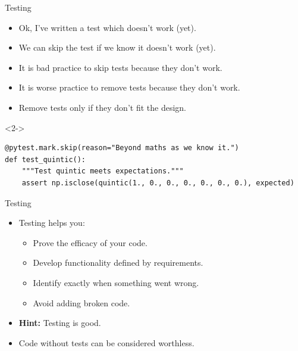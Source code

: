 \documentclass[usenames,dvipsnames]{beamer}
\begin{document}
\begin{frame}[fragile]{Testing}
    \begin{itemize}[<+->]
        \item{}Ok, I've written a test which doesn't work (yet).
        \item{}We can skip the test if we know it doesn't work (yet).
        \item{}It is bad practice to skip tests because they don't work.
        \item{}It is worse practice to remove tests because they don't work.
        \item{}Remove tests only if they don't fit the design.
    \end{itemize}

    \begin{onlyenv}<2->
        \begin{lstlisting}[basicstyle=\scriptsize]
@pytest.mark.skip(reason="Beyond maths as we know it.") 
def test_quintic():
    """Test quintic meets expectations."""
    assert np.isclose(quintic(1., 0., 0., 0., 0., 0., 0.), expected)
        \end{lstlisting}
    \end{onlyenv}
\end{frame}

\begin{frame}{Testing}
    \begin{itemize}[<+->]
        \item{}Testing helps you:
        \begin{itemize}
            \item{}Prove the efficacy of your code.
            \item{}Develop functionality defined by requirements.
            \item{}Identify exactly when something went wrong.
            \item{}Avoid adding broken code.
        \end{itemize}
        \item{}\textbf{Hint:} Testing is good.
        \item{}Code without tests can be considered worthless.
    \end{itemize}

\end{frame}
\end{document}
